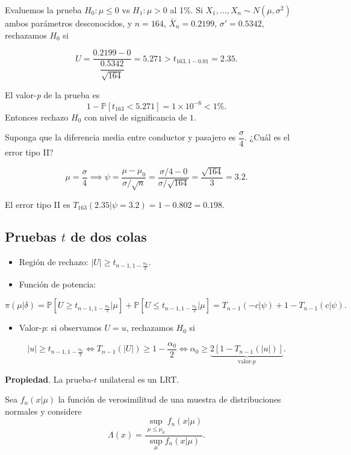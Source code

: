 \documentclass[
  12pt,
]{book}
\providecommand{\tightlist}{%
  \setlength{\itemsep}{0pt}\setlength{\parskip}{0pt}}
\begin{document}
Evaluemos la prueba \(H_0:\mu\leq 0\) vs \(H_1:\mu>0\) al 1\%. Si \(X_1,\dots, X_n \sim N(\mu,\sigma^2)\) ambos parámetros desconocidos, y \(n=164\), \(\bar X_n = 0.2199\), \(\sigma'=0.5342\), rechazamos \(H_0\) si

\[U = \dfrac{0.2199-0}{\dfrac{0.5342}{\sqrt {164}}} = 5.271 >t_{163,1-0.01} = 2.35.\]

El valor-\emph{p} de la prueba es
\[1-\mathbb P[t_{163}<5.271] = 1\times10^{-6}<1\%.\]
Entonces rechazo \(H_0\) con nivel de significancia de \(1%
\).

Suponga que la diferencia media entre conductor y pasajero es \(\dfrac\sigma 4\). ¿Cuál es el error tipo II?

\[\mu =\dfrac\sigma 4\implies \psi = \dfrac{\mu-\mu_0}{\sigma/\sqrt n} = \dfrac{\sigma/4-0}{\sigma/\sqrt{164}} = \dfrac{\sqrt{164}}{3} = 3.2.\]

El error tipo II es \(T_{163}(2.35|\psi =3.2) = 1-0.802 = 0.198\).

\hypertarget{pruebas-t-de-dos-colas}{%
\subsection{\texorpdfstring{Pruebas \(t\) de dos colas}{Pruebas t de dos colas}}\label{pruebas-t-de-dos-colas}}

\begin{itemize}
\item
  Región de rechazo: \(|U|\geq t_{n-1,1-\frac{\alpha_0}2}\).
\item
  Función de potencia:
\end{itemize}

\[\pi(\mu|\delta) = \mathbb P[U\geq t_{n-1,1-\frac{\alpha_0}2}|\mu]+\mathbb P[U\leq t_{n-1,1-\frac{\alpha_0}2}|\mu] = T_{n-1}(-c|\psi) + 1-T_{n-1}(c|\psi). \]

\begin{itemize}
\tightlist
\item
  Valor-\emph{p}: si observamos \(U=u\), rechazamos \(H_0\) si
\end{itemize}

\[|u|\geq t_{n-1,1-\frac{\alpha_0}2} \Leftrightarrow T_{n-1}(|U|)\geq 1-\dfrac{\alpha_0}2 \Leftrightarrow \alpha_0\geq \underbrace{2[1-T_{n-1}(|u|)]}_{\text{valor-}p}.\]

\textbf{Propiedad}. La prueba-\(t\) unilateral es un LRT.

Sea \(f_n(x|\mu)\) la función de verosimilitud de una muestra de distribuciones normales y considere
\[\Lambda(x) = \dfrac{\sup_{\mu\leq\mu_0}f_n(x|\mu)}{\sup_{\mu}f_n(x|\mu)}. \]
\end{document}
